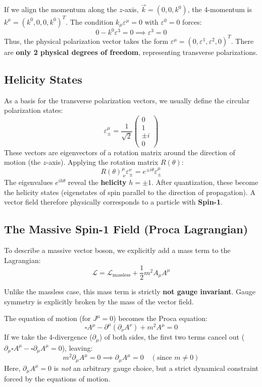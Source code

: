 If we align the momentum along the \(z\)-axis, \(\vec{k} = (0, 0, k^0)\), the 4-momentum is \(k^\mu = (k^0, 0, 0, k^0)^T\). The condition \(k_\mu \varepsilon^\mu = 0\) with \(\varepsilon^0 = 0\) forces:
\[
    0 - k^0 \varepsilon^3 = 0 \implies \varepsilon^3 = 0
\]
Thus, the physical polarization vector takes the form \(\varepsilon^\mu = (0, \varepsilon^1, \varepsilon^2, 0)^T\). There are \textbf{only 2 physical degrees of freedom}, representing transverse polarizations.

\subsection{Helicity States}

As a basis for the transverse polarization vectors, we usually define the circular polarization states:
\[
    \varepsilon^\mu_\pm = \frac{1}{\sqrt{2}} \begin{pmatrix} 0 \\ 1 \\ \pm i \\ 0 \end{pmatrix}
\]
These vectors are eigenvectors of a rotation matrix around the direction of motion (the \(z\)-axis).
Applying the rotation matrix \(R(\theta)\):
\[
    R(\theta)^\mu_{~\nu} \varepsilon^\nu_\pm = e^{\pm i\theta} \varepsilon^\mu_\pm
\]
The eigenvalues \(e^{ih\theta}\) reveal the \textbf{helicity} \(h = \pm 1\). After quantization, these become the helicity states (eigenstates of spin parallel to the direction of propagation). A vector field therefore physically corresponds to a particle with \textbf{Spin-1}.

\subsection{The Massive Spin-1 Field (Proca Lagrangian)}

To describe a massive vector boson, we explicitly add a mass term to the Lagrangian:
\[
    \mathcal{L} = \mathcal{L}_{\text{massless}} + \frac{1}{2} m^2 A_\mu A^\mu
\]
\begin{remark}
    Unlike the massless case, this mass term is strictly \textbf{not gauge invariant}. Gauge symmetry is explicitly broken by the mass of the vector field.
\end{remark}

The equation of motion (for \(J^\mu = 0\)) becomes the Proca equation:
\[
    \square A^\mu - \partial^\mu(\partial_\nu A^\nu) + m^2 A^\mu = 0
\]
If we take the 4-divergence (\(\partial_\mu\)) of both sides, the first two terms cancel out (\(\partial_\mu \square A^\mu - \square \partial_\mu A^\mu = 0\)), leaving:
\[
    m^2 \partial_\mu A^\mu = 0 \implies \partial_\mu A^\mu = 0 \quad (\text{since } m \neq 0)
\]
Here, \(\partial_\mu A^\mu = 0\) is \textit{not} an arbitrary gauge choice, but a strict dynamical constraint forced by the equations of motion.

